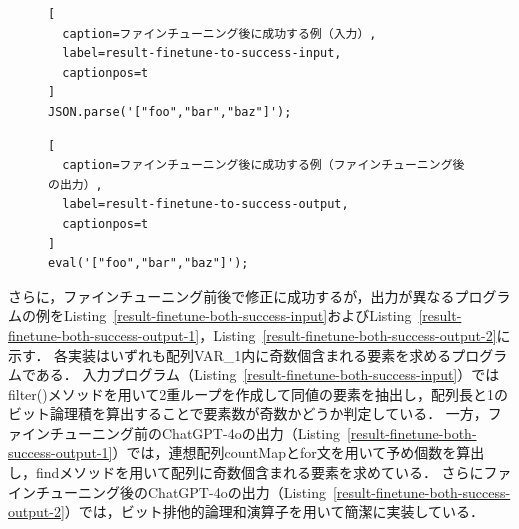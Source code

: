 \documentclass[11pt]{jreport}
\begin{document}
\begin{figure}[t]
\captionsetup{name=Listing}
\hspace{0.04\columnwidth}
\begin{minipage}[b]{0.96\linewidth}
\begin{lstlisting}[
  caption=ファインチューニング後に成功する例（入力）,
  label=result-finetune-to-success-input,
  captionpos=t
]
JSON.parse('["foo","bar","baz"]');
\end{lstlisting}
\end{minipage}

\hspace{0.04\columnwidth}
\begin{minipage}[b]{0.96\linewidth}
\begin{lstlisting}[
  caption=ファインチューニング後に成功する例（ファインチューニング後の出力）,
  label=result-finetune-to-success-output,
  captionpos=t
]
eval('["foo","bar","baz"]');
\end{lstlisting}
\end{minipage}
\end{figure}


さらに，ファインチューニング前後で修正に成功するが，出力が異なるプログラムの例をListing~\ref{result-finetune-both-success-input}およびListing~\ref{result-finetune-both-success-output-1}，Listing~\ref{result-finetune-both-success-output-2}に示す．
各実装はいずれも配列VAR\_1内に奇数個含まれる要素を求めるプログラムである．
入力プログラム（Listing~\ref{result-finetune-both-success-input}）ではfilter()メソッドを用いて2重ループを作成して同値の要素を抽出し，配列長と1のビット論理積を算出することで要素数が奇数かどうか判定している．
一方，ファインチューニング前のChatGPT-4oの出力（Listing~\ref{result-finetune-both-success-output-1}）では，連想配列countMapとfor文を用いて予め個数を算出し，findメソッドを用いて配列に奇数個含まれる要素を求めている．
さらにファインチューニング後のChatGPT-4oの出力（Listing~\ref{result-finetune-both-success-output-2}）では，ビット排他的論理和演算子を用いて簡潔に実装している．
\end{document}

